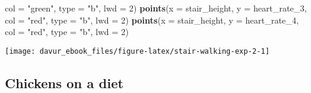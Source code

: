 \documentclass[]{book}
\newenvironment{Shaded}{\begin{snugshade}}{\end{snugshade}}
\newcommand{\DataTypeTok}[1]{\textcolor[rgb]{0.13,0.29,0.53}{#1}}
\newcommand{\DecValTok}[1]{\textcolor[rgb]{0.00,0.00,0.81}{#1}}
\newcommand{\KeywordTok}[1]{\textcolor[rgb]{0.13,0.29,0.53}{\textbf{#1}}}
\newcommand{\NormalTok}[1]{#1}
\newcommand{\StringTok}[1]{\textcolor[rgb]{0.31,0.60,0.02}{#1}}
\begin{document}
\begin{Shaded}
\begin{Highlighting}[]
    \DataTypeTok{col =} \StringTok{"green"}\NormalTok{,}
    \DataTypeTok{type =} \StringTok{"b"}\NormalTok{,}
    \DataTypeTok{lwd =} \DecValTok{2}\NormalTok{)}
\KeywordTok{points}\NormalTok{(}\DataTypeTok{x =}\NormalTok{ stair_height,}
    \DataTypeTok{y =}\NormalTok{ heart_rate_}\DecValTok{3}\NormalTok{,}
    \DataTypeTok{col =} \StringTok{"red"}\NormalTok{,}
    \DataTypeTok{type =} \StringTok{"b"}\NormalTok{,}
    \DataTypeTok{lwd =} \DecValTok{2}\NormalTok{)}
\KeywordTok{points}\NormalTok{(}\DataTypeTok{x =}\NormalTok{ stair_height,}
    \DataTypeTok{y =}\NormalTok{ heart_rate_}\DecValTok{4}\NormalTok{,}
    \DataTypeTok{col =} \StringTok{"red"}\NormalTok{,}
    \DataTypeTok{type =} \StringTok{"b"}\NormalTok{,}
    \DataTypeTok{lwd =} \DecValTok{2}\NormalTok{)}
\end{Highlighting}
\end{Shaded}

\begin{center}\texttt{[image: davur\_ebook\_files/figure-latex/stair-walking-exp-2-1]} \end{center}

\hypertarget{chickens-on-a-diet-1}{%
\subsection{Chickens on a diet}\label{chickens-on-a-diet-1}}
\end{document}
